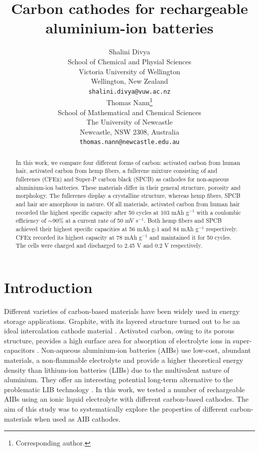 \documentclass{article}
\title{Carbon cathodes for rechargeable aluminium-ion batteries}
\author{
  Shalini Divya\\
  School of Chemical and Physial Sciences\\
  Victoria University of Wellington\\
  Wellington, New Zealand\\
  \texttt{shalini.divya@vuw.ac.nz}\\
   \And
  Thomas Nann\thanks{Corresponding author.}\\
  School of Mathematical and Chemical Sciences\\
  The University of Newcastle\\
  Newcastle, NSW 2308, Australia\\
  \texttt{thomas.nann@newcastle.edu.au}\\
}
\begin{document}
\maketitle
\begin{abstract}
 In this work, we compare four different forms of carbon: activated carbon from human hair, activated carbon from hemp fibers, a fullerene mixture consisting of  and  fullerenes (CFEx) and Super-P carbon black (SPCB) as cathodes for non-aqueous aluminium-ion batteries. These materials differ in their general structure, porosity and morphology. The fullerenes display a crystalline structure, whereas hemp fibers, SPCB and hair are amorphous in nature. Of all materials, activated carbon from human hair recorded the highest specific capacity after 50 cycles at 103 mAh g$^{-1}$ with a coulombic efficiency of $\sim$90\% at a current rate of 50 mV s$^{-1}$. Both hemp fibers and SPCB achieved their highest specific capacities at 56 mAh g-1 and 84 mAh g$^{-1}$ respectively. CFEx recorded its highest capacity at 78 mAh g$^{-1}$ and maintained it for 50 cycles. The cells were charged and discharged to 2.45 V and 0.2 V respectively. 
 \end{abstract}
 

\section{Introduction}
Different varieties of carbon-based materials have been widely used in energy storage applications. Graphite, with its layered structure turned out to be an ideal intercalation cathode material \cite{ji_recent_2011, yoo_large_2008, lian_large_2010}. Activated carbon, owing to its porous structure, provides a high surface area for absorption of electrolyte ions in super-capacitors \cite{eliad_ion_2001, zhu_carbon-based_2011-2}. Non-aqueous aluminium-ion batteries (AIBs) use low-cost, abundant materials, a non-flammable electrolyte and provide a higher theoretical energy density than lithium-ion batteries (LIBs) due to the multivalent nature of aluminium. They offer an interesting potential long-term alternative to the problematic LIB technology \cite{ambroz_trends_2017-1}. In this work, we tested a number of rechargeable AIBs using an ionic liquid electrolyte with different carbon-based cathodes. The aim of this study was to systematically explore the properties of different carbon-materials when used as AIB cathodes.
\end{document}
